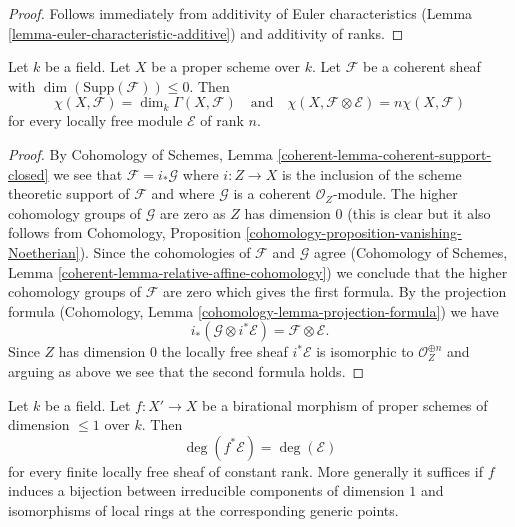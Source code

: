 \begin{proof}
Follows immediately from additivity of Euler characteristics
(Lemma \ref{lemma-euler-characteristic-additive})
and additivity of ranks.
\end{proof}

\begin{lemma}
\label{lemma-chi-tensor-finite}
Let $k$ be a field. Let $X$ be a proper scheme over $k$. Let $\mathcal{F}$
be a coherent sheaf with $\dim(\text{Supp}(\mathcal{F})) \leq 0$.
Then
$$
\chi(X, \mathcal{F}) = \dim_k\Gamma(X, \mathcal{F})
\quad\text{and}\quad
\chi(X, \mathcal{F} \otimes \mathcal{E}) = n\chi(X, \mathcal{F})
$$
for every locally free module $\mathcal{E}$ of rank $n$.
\end{lemma}

\begin{proof}
By Cohomology of Schemes, Lemma \ref{coherent-lemma-coherent-support-closed}
we see that $\mathcal{F} = i_*\mathcal{G}$ where $i : Z \to X$ is the inclusion
of the scheme theoretic support of $\mathcal{F}$ and where $\mathcal{G}$
is a coherent $\mathcal{O}_Z$-module. The higher cohomology groups of
$\mathcal{G}$ are zero as $Z$ has dimension $0$ (this is clear but it also
follows from
Cohomology, Proposition \ref{cohomology-proposition-vanishing-Noetherian}).
Since the cohomologies of $\mathcal{F}$ and $\mathcal{G}$ agree
(Cohomology of Schemes, Lemma \ref{coherent-lemma-relative-affine-cohomology})
we conclude that the higher cohomology groups of $\mathcal{F}$ are zero
which gives the first formula. By the projection formula
(Cohomology, Lemma \ref{cohomology-lemma-projection-formula}) we have
$$
i_*(\mathcal{G} \otimes i^*\mathcal{E}) = \mathcal{F} \otimes \mathcal{E}.
$$
Since $Z$ has dimension $0$ the locally free sheaf $i^*\mathcal{E}$
is isomorphic to $\mathcal{O}_Z^{\oplus n}$ and arguing as above
we see that the second formula holds.
\end{proof}

\begin{lemma}
\label{lemma-degree-birational-pullback}
Let $k$ be a field. Let $f : X' \to X$ be a birational morphism of
proper schemes of dimension $\leq 1$ over $k$. Then
$$
\deg(f^*\mathcal{E}) = \deg(\mathcal{E})
$$
for every finite locally free sheaf of constant rank. More generally
it suffices if $f$ induces a bijection between irreducible components
of dimension $1$ and isomorphisms of local rings at the corresponding
generic points.
\end{lemma}

